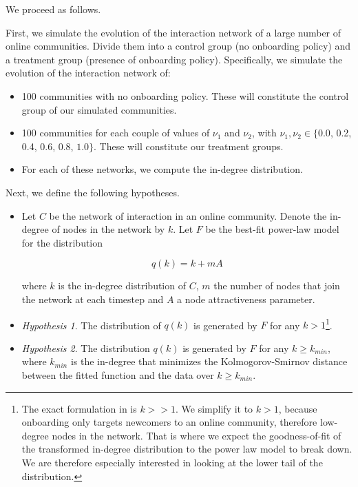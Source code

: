 \documentclass{bmcart}
\begin{document}
We proceed as follows.

First, we simulate the evolution of the interaction network of a large number of online communities. Divide them into a control group (no onboarding policy) and a treatment group (presence of onboarding policy). Specifically, we simulate the evolution of the interaction network of:

\begin{itemize}
\item 100 communities with no onboarding policy. These will constitute the control group of our simulated communities. 
\item 100 communities for each couple of values of $\nu_1$  and $\nu_2$, with $\nu_1, \nu_2 \in \{0.0$, 0.2, 0.4, 0.6, 0.8, $1.0\}$. These will constitute our treatment groups.
\item For each of these networks, we compute the in-degree distribution.
\end{itemize}

Next, we define the following hypotheses. 


\begin{itemize}
\item Let $C$ be the network of interaction in an online community. Denote the in-degree of nodes in the network by $k$. Let $F$ be the best-fit power-law model for the distribution 

\begin{equation}
\label{eq:tIDD}
 q(k) = k + mA
\end{equation}
 
 where $k$ is the in-degree distribution of $C$, $m$ the number of nodes that join the network at each timestep and $A$ a node attractiveness parameter.
\item \emph{Hypothesis 1}. The distribution of $q(k)$ is generated by $F$ for any $k > 1$\footnote{The exact formulation in \cite{dorogovtsev2002evolution} is $k > > 1$. We simplify it to $k > 1$, because onboarding only targets newcomers to an online community, therefore low-degree nodes in the network. That is where we expect the goodness-of-fit of the transformed in-degree distribution to the power law model to break down. We are therefore especially interested in looking at the lower tail of the distribution.}.
\item \emph{Hypothesis 2}. The distribution $q(k)$ is generated by $F$ for any $k \geq k_{min}$, where $k_{min}$ is the in-degree that minimizes the Kolmogorov-Smirnov distance between the fitted function and the data over $k \geq k_{min}$.
\end{itemize}
\end{document}
